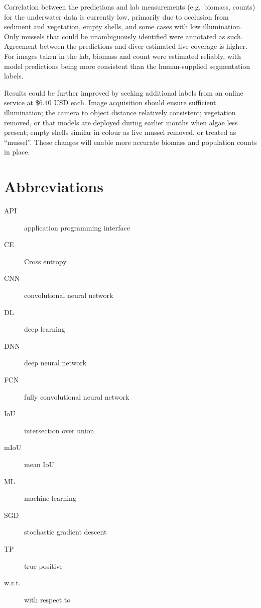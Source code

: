 \documentclass[11pt]{article} %
\begin{document}
Correlation between the predictions and lab measurements (e.g.~biomass, 
counts) for the underwater data is currently low, primarily due to occlusion 
from sediment and vegetation, empty shells, and some cases with low 
illumination. Only mussels that could be unambiguously identified were 
annotated as such. Agreement between the predictions and diver estimated live 
coverage is higher. For images taken in the lab, biomass and count were 
estimated reliably, with model predictions being more consistent than the
human-supplied segmentation labels. 

Results could be further improved by seeking additional labels from an online 
service at \$6.40 USD each. Image acquisition should ensure 
sufficient illumination; the camera to object distance relatively consistent;
vegetation removed, or that models are deployed during earlier months when algae
less present; empty shells similar in colour as live mussel removed, or treated
as ``mussel''. These changes will enable more 
accurate biomass and population counts in place.

\clearpage

\tableofcontents

\clearpage

\section*{Abbreviations}

\begin{description}
\item[API] application programming interface
\item[CE] Cross entropy
\item[CNN] convolutional neural network
\item[DL] deep learning
\item[DNN] deep neural network
\item[FCN] fully convolutional neural network
\item[IoU] intersection over union
\item[mIoU] mean IoU
\item[ML] machine learning
\item[SGD] stochastic gradient descent
\item[TP] true positive
\item[w.r.t.] with respect to
\end{description}

\clearpage

\setcounter{page}{1}
\end{document}
